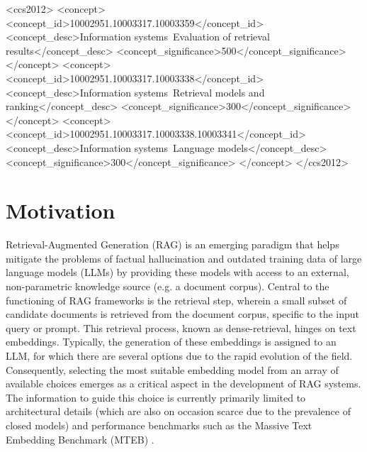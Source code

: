 \documentclass[nonacm,sigconf]{acmart}
\begin{document}
\begin{CCSXML}
<ccs2012>
    <concept>
       <concept_id>10002951.10003317.10003359</concept_id>
       <concept_desc>Information systems~Evaluation of retrieval results</concept_desc>
       <concept_significance>500</concept_significance>
    </concept>
    <concept>
       <concept_id>10002951.10003317.10003338</concept_id>
       <concept_desc>Information systems~Retrieval models and ranking</concept_desc>
       <concept_significance>300</concept_significance>
    </concept>
     <concept>
        <concept_id>10002951.10003317.10003338.10003341</concept_id>
        <concept_desc>Information systems~Language models</concept_desc>
        <concept_significance>300</concept_significance>
    </concept>
 </ccs2012>
\end{CCSXML}



\maketitle

\section{Motivation}

Retrieval-Augmented Generation (RAG) is an emerging paradigm that helps mitigate the problems of factual hallucination \cite{hallucination} and outdated training data \cite{outdated} of large language models (LLMs) by providing these models with access to an external, non-parametric knowledge source (e.g. a document corpus). Central to the functioning of RAG frameworks is the retrieval step, wherein a small subset of candidate documents is retrieved from the document corpus, specific to the input query or prompt. This retrieval process, known as dense-retrieval, hinges on text embeddings. Typically, the generation of these embeddings is assigned to an LLM, for which there are several options due to the rapid evolution of the field. Consequently, selecting the most suitable embedding model from an array of available choices emerges as a critical aspect in the development of RAG systems. The information to guide this choice is currently primarily limited to architectural details (which are also on occasion scarce due to the prevalence of closed models) and performance benchmarks such as the Massive Text Embedding Benchmark (MTEB) \cite{mteb}.
\end{document}
